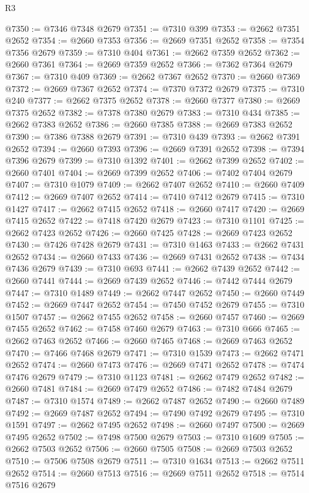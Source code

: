 \begin{lexlean}{R3}
\begin{coremodule}
@7350 := @7346 @7348 @2679
@7351 := @7310 @399
@7353 := @2662 @7351 @2652
@7354 := @2660 @7353
@7356 := @2669 @7351 @2652
@7358 := @7354 @7356 @2679
@7359 := @7310 @404
@7361 := @2662 @7359 @2652
@7362 := @2660 @7361
@7364 := @2669 @7359 @2652
@7366 := @7362 @7364 @2679
@7367 := @7310 @409
@7369 := @2662 @7367 @2652
@7370 := @2660 @7369
@7372 := @2669 @7367 @2652
@7374 := @7370 @7372 @2679
@7375 := @7310 @240
@7377 := @2662 @7375 @2652
@7378 := @2660 @7377
@7380 := @2669 @7375 @2652
@7382 := @7378 @7380 @2679
@7383 := @7310 @434
@7385 := @2662 @7383 @2652
@7386 := @2660 @7385
@7388 := @2669 @7383 @2652
@7390 := @7386 @7388 @2679
@7391 := @7310 @439
@7393 := @2662 @7391 @2652
@7394 := @2660 @7393
@7396 := @2669 @7391 @2652
@7398 := @7394 @7396 @2679
@7399 := @7310 @1392
@7401 := @2662 @7399 @2652
@7402 := @2660 @7401
@7404 := @2669 @7399 @2652
@7406 := @7402 @7404 @2679
@7407 := @7310 @1079
@7409 := @2662 @7407 @2652
@7410 := @2660 @7409
@7412 := @2669 @7407 @2652
@7414 := @7410 @7412 @2679
@7415 := @7310 @1427
@7417 := @2662 @7415 @2652
@7418 := @2660 @7417
@7420 := @2669 @7415 @2652
@7422 := @7418 @7420 @2679
@7423 := @7310 @1101
@7425 := @2662 @7423 @2652
@7426 := @2660 @7425
@7428 := @2669 @7423 @2652
@7430 := @7426 @7428 @2679
@7431 := @7310 @1463
@7433 := @2662 @7431 @2652
@7434 := @2660 @7433
@7436 := @2669 @7431 @2652
@7438 := @7434 @7436 @2679
@7439 := @7310 @693
@7441 := @2662 @7439 @2652
@7442 := @2660 @7441
@7444 := @2669 @7439 @2652
@7446 := @7442 @7444 @2679
@7447 := @7310 @1489
@7449 := @2662 @7447 @2652
@7450 := @2660 @7449
@7452 := @2669 @7447 @2652
@7454 := @7450 @7452 @2679
@7455 := @7310 @1507
@7457 := @2662 @7455 @2652
@7458 := @2660 @7457
@7460 := @2669 @7455 @2652
@7462 := @7458 @7460 @2679
@7463 := @7310 @666
@7465 := @2662 @7463 @2652
@7466 := @2660 @7465
@7468 := @2669 @7463 @2652
@7470 := @7466 @7468 @2679
@7471 := @7310 @1539
@7473 := @2662 @7471 @2652
@7474 := @2660 @7473
@7476 := @2669 @7471 @2652
@7478 := @7474 @7476 @2679
@7479 := @7310 @1123
@7481 := @2662 @7479 @2652
@7482 := @2660 @7481
@7484 := @2669 @7479 @2652
@7486 := @7482 @7484 @2679
@7487 := @7310 @1574
@7489 := @2662 @7487 @2652
@7490 := @2660 @7489
@7492 := @2669 @7487 @2652
@7494 := @7490 @7492 @2679
@7495 := @7310 @1591
@7497 := @2662 @7495 @2652
@7498 := @2660 @7497
@7500 := @2669 @7495 @2652
@7502 := @7498 @7500 @2679
@7503 := @7310 @1609
@7505 := @2662 @7503 @2652
@7506 := @2660 @7505
@7508 := @2669 @7503 @2652
@7510 := @7506 @7508 @2679
@7511 := @7310 @1634
@7513 := @2662 @7511 @2652
@7514 := @2660 @7513
@7516 := @2669 @7511 @2652
@7518 := @7514 @7516 @2679

\end{coremodule}
\end{lexlean}
